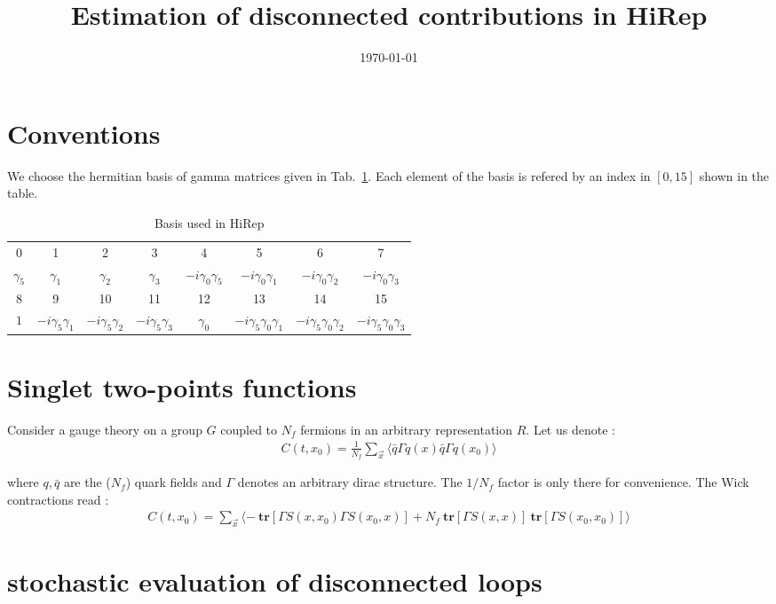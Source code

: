 \documentclass[a4paper]{article}
\title{Estimation of disconnected contributions in HiRep}
\date{\today}
\newcommand{\tr}{\mathrm{tr}}
\newcommand{\beq}{\begin{eqnarray}}
\newcommand{\eeq}{\end{eqnarray}}
\def\la{\langle}
\def\ra{\rangle}
\def\tr#1{{~\mathbf{tr}\left[#1\right]}}
\begin{document}
\maketitle



\section{Conventions}
We choose the  hermitian basis of gamma matrices given in Tab.~\ref{tab:Gamma_basis}. Each element of the basis is refered by an index in $[0,15]$ shown in the table.

\begin{table}[ht]
\begin{center}
 \begin{tabular}[h]{cccccccc}
\hline
0 & 1 & 2 & 3 & 4 & 5 & 6 & 7 \\
$\gamma_5$ & $\gamma_1$  & $\gamma_2$  & $\gamma_3$ & $-i\gamma_0 \gamma_5$  & $-i\gamma_0 \gamma_1$  & $-i\gamma_0 \gamma_2$ &$-i\gamma_0 \gamma_3$   \\
\hline\hline
 8 & 9 & 10 & 11 & 12 & 13 & 14 & 15 \\
 $1$  & $-i\gamma_5 \gamma_1$  & $-i\gamma_5 \gamma_2$  & $-i\gamma_5 \gamma_3$  &  $\gamma_0$  & $-i\gamma_5\gamma_0\gamma_1 $  & $-i\gamma_5 \gamma_0\gamma_2$  & $-i\gamma_5 \gamma_0 \gamma_3$ \\
\hline
 \end{tabular}
\label{tab:Gamma_basis}
\caption{Basis used in HiRep}
\end{center}
\end{table}


\section{Singlet two-points functions}

Consider a gauge theory on a group $G$  coupled to $N_f$ fermions in
an arbitrary representation $R$.
Let us denote :
\beq
\label{eq:corr_scalar}
C(t,x_0) = \frac{1}{N_f} \sum_{\vec{x}}  \la \bar{q}  \Gamma  q (x) \bar{q} \Gamma q (x_0) \ra
\eeq

where $q,\bar{q}$ are the ($N_f$) quark fields and $\Gamma$ denotes an
arbitrary dirac structure. The $1/N_f$ factor is only there for convenience.
The Wick contractions read :
\beq
C(t,x_0) =  \sum_{\vec{x}} \la  -\tr{\Gamma S(x,x_0) \Gamma S(x_0,x)
}+ N_f  \tr{\Gamma S(x,x)} \tr{\Gamma  S(x_0,x_0)} \ra
\eeq

\section{stochastic evaluation of disconnected loops}
\end{document}
